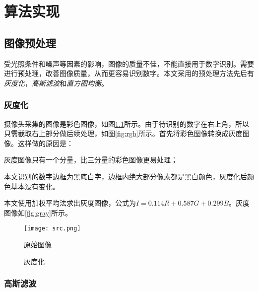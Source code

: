 
\chapter{算法实现}

\section{图像预处理}

受光照条件和噪声等因素的影响，图像的质量不佳，不能直接用于数字识别。需要进行预处理，改善图像质量，从而更容易识别数字。本文采用的预处理方法先后有\emph{灰度化}，\emph{高斯滤波}和\emph{直方图均衡}。

\subsection{灰度化}



摄像头采集的图像是彩色图像，如图\ref{fig:src}所示。由于待识别的数字在右上角，所以只需截取右上部分做后续处理，如图\ref{fig:rgb}所示。首先将彩色图像转换成灰度图像。这样做的原因是：
\begin{asparaenum}[(1)]
\item 灰度图像只有一个分量，比三分量的彩色图像更易处理；
\item 本文识别的数字边框为黑底白字，边框内绝大部分像素都是黑白颜色，灰度化后颜色基本没有变化。
\end{asparaenum}

本文使用加权平均法求出灰度图像，公式为$I=0.114R+0.587G+0.299B$。灰度图像如\ref{fig:gray}所示。
\begin{figure}[h]
  \centering
  \texttt{[image: src.png]}
  \caption{原始图像}
  \label{fig:src}
\end{figure}
\begin{figure}[h]
  \centering
  \hspace{1in}
  \caption{灰度化}
\end{figure}

\subsection{高斯滤波}


